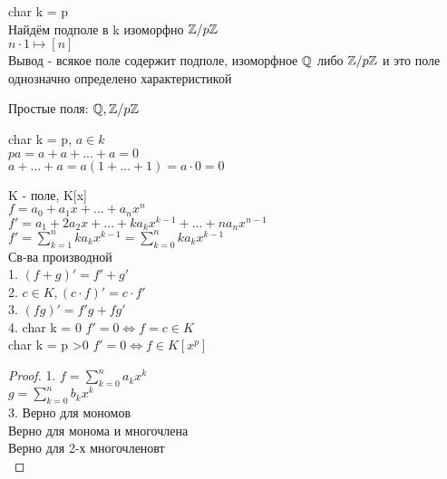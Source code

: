 char k = p \\
Найдём подполе в k изоморфно $ \mathbb{Z} / p\mathbb{Z} $ \\
$ n \cdot 1 \mapsto [n] $ \\
Вывод - всякое поле содержит подполе, изоморфное $ \mathbb{Q} $ либо $ \mathbb{Z} /p\mathbb{Z} $ и это поле однозначно определено характеристикой \\
\begin{definition}
	Простые поля: $ \mathbb{Q}, \mathbb{Z}/p\mathbb{Z}$ 
\end{definition}
char k = p, $ a \in k $ \\
$ pa = a+a+...+a = 0 $ \\
$ a+...+a = a(1+...+1) = a \cdot 0 = 0$ 
 

K - поле, K[x]  \\
$ f = a_0+a_1x+...+a_nx^n $ \\
$ f' = a_1 + 2a_2x+... + ka_kx^{k-1} +... + na_nx^{n-1} $\\
$ f' = \sum_{k=1}^{n}k a_kx^{k-1} = \sum_{k=0}^{n} k a_k x^{k-1} $ \\
Св-ва производной \\
1. $ (f+g)' = f' + g' $ \\
2. $ c \in K, (c \cdot f)' = c \cdot f' $ \\
3. $ (fg)' = f'g + fg' $ \\
4. char k = 0 $ f' = 0 \Leftrightarrow f = c \in K $\\
char k = p >0 $ f'=0 \Leftrightarrow f \in K[x^p] $ \\
\begin{proof}
	1. $ f = \sum_{k=0}^{n} a_k x^{k} $ \\
	$ g=  \sum_{k=0}^{n}b_k x^{k} $ \\ 
	3. Верно для мономов \\
	Верно для монома и многочлена \\
	Верно для 2-х многочленовт\\
\end{proof}

